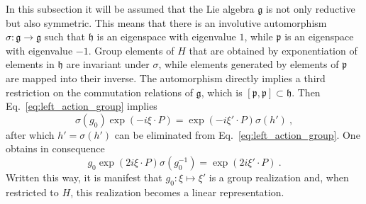 \documentclass[11pt]{article}
\begin{document}
In this subsection it will be assumed that the Lie algebra 
$\mathfrak{g}$ is not only reductive but also symmetric. This 
means that there is an involutive automorphism $\sigma : 
\mathfrak{g} \to \mathfrak{g}$ such that $\mathfrak{h}$ is an 
eigenspace with eigenvalue $1$, while $\mathfrak{p}$ is an 
eigenspace with eigenvalue $-1$. Group elements of $H$ that are 
obtained by exponentiation of elements in $\mathfrak{h}$ are 
invariant under $\sigma$, while elements generated by elements of 
$\mathfrak{p}$ are mapped into their inverse. The automorphism 
directly implies a third restriction on the commutation relations 
of $\mathfrak{g}$, which is $[\mathfrak{p},\mathfrak{p}] \subset 
\mathfrak{h}$. Then Eq.~\eqref{eq:left_action_group} implies
\begin{displaymath}
	\sigma(g_0) \exp(-i\xi\cdot P) = \exp(-i\xi'\cdot 
	P)\sigma(h')~,
\end{displaymath}
after which $h' = \sigma(h')$ can be eliminated from 
Eq.~\eqref{eq:left_action_group}. One obtains in consequence
%
\begin{equation}
	g_0 \exp(2i\xi\cdot P) \sigma(g_0^{-1}) = \exp(2i\xi'\cdot 
	P)~.
\end{equation}
Written this way, it is manifest that $g_0 : \xi \mapsto \xi'$ is 
a group realization and, when restricted to $H$, this realization 
becomes a linear representation.
\end{document}

